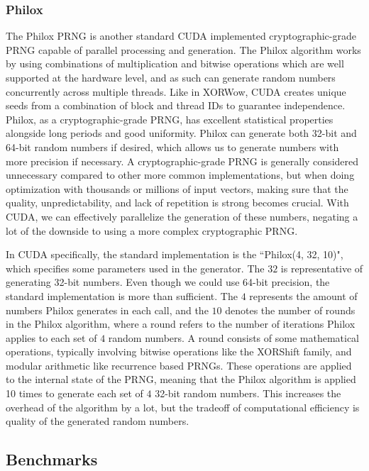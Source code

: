 \documentclass{article}
\begin{document}
            \subsubsection{Philox}
The Philox PRNG is another standard CUDA implemented cryptographic-grade PRNG capable of parallel processing and generation. The Philox algorithm works by using combinations of multiplication and bitwise operations which are well supported at the hardware level, and as such can generate random numbers concurrently across multiple threads. Like in XORWow, CUDA creates unique seeds from a combination of block and thread IDs to guarantee independence. Philox, as a cryptographic-grade PRNG, has excellent statistical properties alongside long periods and good uniformity. Philox can generate both 32-bit and 64-bit random numbers if desired, which allows us to generate numbers with more precision if necessary. A cryptographic-grade PRNG is generally considered unnecessary compared to other more common implementations, but when doing optimization with thousands or millions of input vectors, making sure that the quality, unpredictability, and lack of repetition is strong becomes crucial. With CUDA, we can effectively parallelize the generation of these numbers, negating a lot of the downside to using a more complex cryptographic PRNG. 

In CUDA specifically, the standard implementation is the ``Philox(4, 32, 10)", which specifies some parameters used in the generator. The $32$ is representative of generating 32-bit numbers. Even though we could use 64-bit precision, the standard implementation is more than sufficient. The $4$ represents the amount of numbers Philox generates in each call, and the $10$ denotes the number of rounds in the Philox algorithm, where a round refers to the number of iterations Philox applies to each set of $4$ random numbers. A round consists of some mathematical operations, typically involving bitwise operations like the XORShift family, and modular arithmetic like recurrence based PRNGs. These operations are applied to the internal state of the PRNG, meaning that the Philox algorithm is applied 10 times to generate each set of $4$ 32-bit random numbers. This increases the overhead of the algorithm by a lot, but the tradeoff of computational efficiency is quality of the generated random numbers.


        \subsection{Benchmarks}
\end{document}
